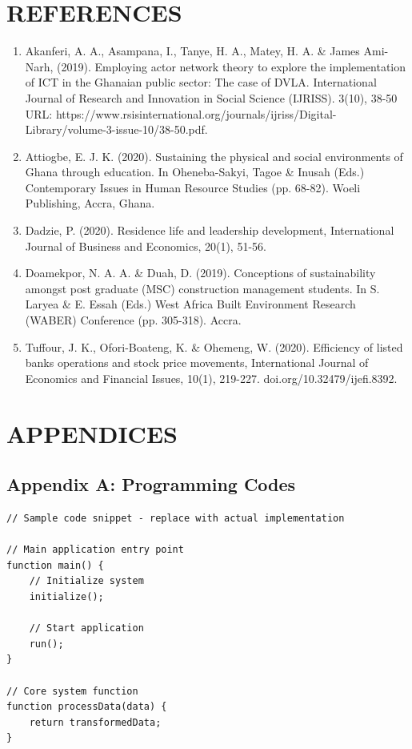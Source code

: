 \documentclass[12pt,twoside]{report}
\begin{document}
\newpage

\chapter*{REFERENCES}
\begin{enumerate}
    \item Akanferi, A. A., Asampana, I., Tanye, H. A., Matey, H. A. & James Ami-Narh, (2019). Employing actor network theory to explore the implementation of ICT in the Ghanaian public sector: The case of DVLA. International Journal of Research and Innovation in Social Science (IJRISS). 3(10), 38-50 URL: https://www.rsisinternational.org/journals/ijriss/Digital-Library/volume-3-issue-10/38-50.pdf.
    
    \item Attiogbe, E. J. K. (2020). Sustaining the physical and social environments of Ghana through education. In Oheneba-Sakyi, Tagoe & Inusah (Eds.) Contemporary Issues in Human Resource Studies (pp. 68-82). Woeli Publishing, Accra, Ghana.
    
    \item Dadzie, P. (2020). Residence life and leadership development, International Journal of Business and Economics, 20(1), 51-56.
    
    \item Doamekpor, N. A. A. & Duah, D. (2019). Conceptions of sustainability amongst post graduate (MSC) construction management students. In S. Laryea & E. Essah (Eds.) West Africa Built Environment Research (WABER) Conference (pp. 305-318). Accra.
    
    \item Tuffour, J. K., Ofori-Boateng, K. & Ohemeng, W. (2020). Efficiency of listed banks operations and stock price movements, International Journal of Economics and Financial Issues, 10(1), 219-227. doi.org/10.32479/ijefi.8392.
\end{enumerate}
\newpage

\chapter*{APPENDICES}
\section{Appendix A: Programming Codes}
\begin{verbatim}
// Sample code snippet - replace with actual implementation

// Main application entry point
function main() {
    // Initialize system
    initialize();
    
    // Start application
    run();
}

// Core system function
function processData(data) {
    return transformedData;
}
\end{verbatim}
\end{document}
